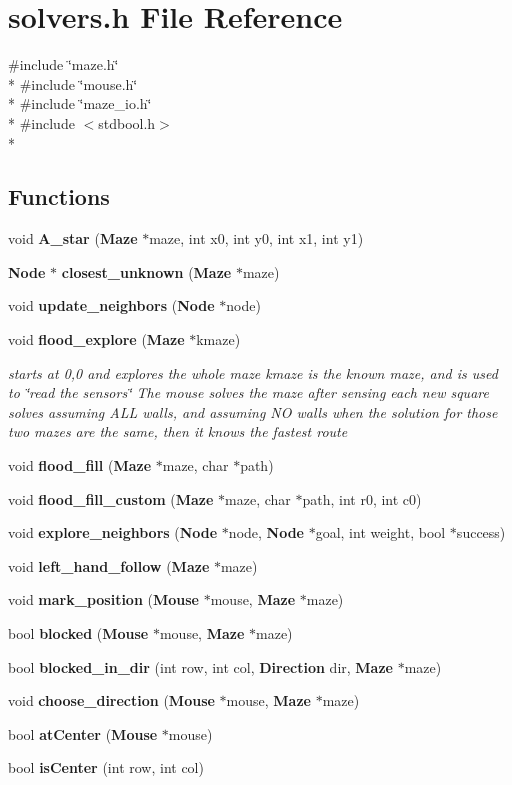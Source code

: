 \section{solvers.\-h File Reference}
\label{solvers_8h}
{\ttfamily \#include \char`\"{}maze.\-h\char`\"{}}\\*
{\ttfamily \#include \char`\"{}mouse.\-h\char`\"{}}\\*
{\ttfamily \#include \char`\"{}maze\-\_\-io.\-h\char`\"{}}\\*
{\ttfamily \#include $<$stdbool.\-h$>$}\\*
\subsection*{Functions}
\begin{DoxyCompactItemize}
\item 
void {\bf A\-\_\-star} ({\bf Maze} $\ast$maze, int x0, int y0, int x1, int y1)
\item 
{\bf Node} $\ast$ {\bf closest\-\_\-unknown} ({\bf Maze} $\ast$maze)
\item 
void {\bf update\-\_\-neighbors} ({\bf Node} $\ast$node)
\item 
void {\bf flood\-\_\-explore} ({\bf Maze} $\ast$kmaze)
\begin{DoxyCompactList}\small\item\em starts at 0,0 and explores the whole maze kmaze is the known maze, and is used to \char`\"{}read the sensors\char`\"{} The mouse solves the maze after sensing each new square solves assuming A\-L\-L walls, and assuming N\-O walls when the solution for those two mazes are the same, then it knows the fastest route \end{DoxyCompactList}\item 
void {\bf flood\-\_\-fill} ({\bf Maze} $\ast$maze, char $\ast$path)
\item 
void {\bf flood\-\_\-fill\-\_\-custom} ({\bf Maze} $\ast$maze, char $\ast$path, int r0, int c0)
\item 
void {\bf explore\-\_\-neighbors} ({\bf Node} $\ast$node, {\bf Node} $\ast$goal, int weight, bool $\ast$success)
\item 
void {\bf left\-\_\-hand\-\_\-follow} ({\bf Maze} $\ast$maze)
\item 
void {\bf mark\-\_\-position} ({\bf Mouse} $\ast$mouse, {\bf Maze} $\ast$maze)
\item 
bool {\bf blocked} ({\bf Mouse} $\ast$mouse, {\bf Maze} $\ast$maze)
\item 
bool {\bf blocked\-\_\-in\-\_\-dir} (int row, int col, {\bf Direction} dir, {\bf Maze} $\ast$maze)
\item 
void {\bf choose\-\_\-direction} ({\bf Mouse} $\ast$mouse, {\bf Maze} $\ast$maze)
\item 
bool {\bf at\-Center} ({\bf Mouse} $\ast$mouse)
\item 
bool {\bf is\-Center} (int row, int col)
\end{DoxyCompactItemize}


